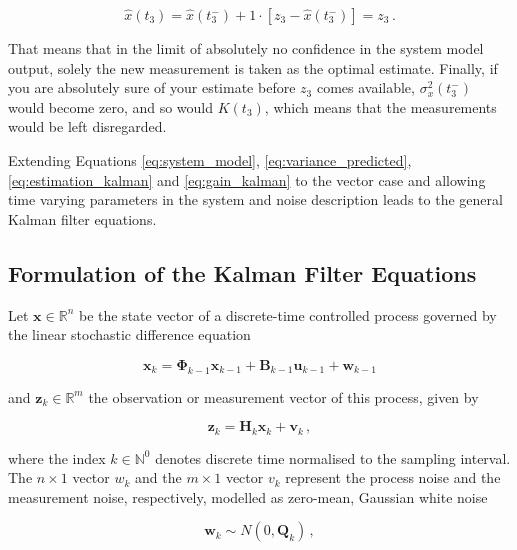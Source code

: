 \begin{equation}\label{eq:prediction_kalman}
  \hat{x}(t_3) = \hat{x}(t^-_3) + 1 \cdot [z_3-\hat{x}(t^-_3)] = z_3\,.
\end{equation}

\noindent
That means that in the limit of absolutely no confidence in the system model output, solely the new measurement is taken as the optimal estimate. Finally, if you are absolutely sure of your estimate before $z_3$ comes available, $\sigma^2_x(t^-_3)$ would become zero, and so would $K(t_3)$, which means that the measurements would be left disregarded. 

Extending Equations \ref{eq:system_model}, \ref{eq:variance_predicted}, \ref{eq:estimation_kalman} and \ref{eq:gain_kalman} to the vector case and allowing time varying parameters in the system and noise description leads to the general Kalman filter equations.

\subsection{Formulation of the Kalman Filter Equations}

Let $\mathbf{x} \in \mathbb{R}^n$ be the state vector of a discrete-time controlled process governed by the linear stochastic difference equation 

\begin{equation}\label{eq:time_dynamical_system_plant}
  \mathbf{x}_k = \mathbf{\Phi}_{k-1}\mathbf{x}_{k-1}+\mathbf{B}_{k-1}\mathbf{u}_{k-1}+\mathbf{w}_{k-1}
\end{equation}

\noindent
and $\mathbf{z}_k \in \mathbb{R}^m$ the observation or measurement vector of this process, given by

\begin{equation}\label{eq:time_dynamical_system_measurement}
  \mathbf{z}_k = \mathbf{H}_{k}\mathbf{x}_{k}+\mathbf{v}_{k}\,,
\end{equation}

\noindent
where the index $k \in \mathbb{N}^0$ denotes discrete time normalised to the sampling interval. The $n\times1$ vector $w_k$ and the $m\times1$ vector $v_k$ represent the process noise and the measurement noise, respectively, modelled as zero-mean, Gaussian white noise

\begin{equation}\label{eq:process_noise}
  \mathbf{w}_{k} \sim N(0,\mathbf{Q}_k)\,,
\end{equation}

